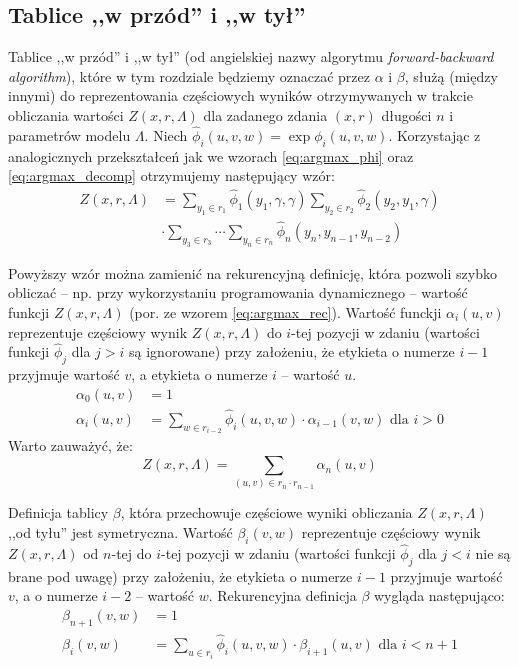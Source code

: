 \documentclass[a4paper,10]{article}
\begin{document}
\subsection{Tablice ,,w przód'' i ,,w tył''}

Tablice ,,w przód'' i ,,w tył'' (od angielskiej nazwy algorytmu
\emph{forward-backward algorithm}), które w tym rozdziale będziemy
oznaczać przez $\alpha$ i $\beta$, służą (między innymi) do
reprezentowania częściowych wyników otrzymywanych w trakcie obliczania
wartości $Z(x, r, \Lambda)$ dla zadanego zdania $(x, r)$ długości $n$
i parametrów modelu $\Lambda$. 
Niech $\hat\phi_i(u, v, w) = \exp\phi_i(u, v, w)$.
Korzystając z analogicznych przekształceń jak we wzorach \ref{eq:argmax_phi}
oraz \ref{eq:argmax_decomp} otrzymujemy następujący wzór: 
\begin{align}
Z(x, r, \Lambda) &=
  \sum_{y_1 \in r_1} \hat\phi_1(y_1, \gamma, \gamma)
  \sum_{y_2 \in r_2} \hat\phi_2(y_2, y_1, \gamma)\\
  &\cdot
  \sum_{y_3 \in r_3} \dotsm
  \sum_{y_n \in r_n} \hat\phi_n(y_n, y_{n-1}, y_{n-2}) \nonumber
\end{align}

Powyższy wzór można zamienić na rekurencyjną definicję, która pozwoli
szybko obliczać -- np. przy wykorzystaniu programowania dynamicznego
-- wartość funkcji $Z(x, r, \Lambda)$ (por. ze wzorem \ref{eq:argmax_rec}).
Wartość funckji $\alpha_i(u, v)$ reprezentuje częściowy wynik $Z(x, r, \Lambda)$
do $i$-tej pozycji w zdaniu (wartości funkcji $\hat\phi_j$ dla
$j > i$ są ignorowane) przy założeniu, że etykieta o numerze $i-1$
przyjmuje wartość $v$, a etykieta o numerze $i$ -- wartość $u$.
\begin{align}
\alpha_0(u, v) &= 1 \\
\alpha_i(u, v) &= \sum_{w \in r_{i-2}}
    \hat\phi_i(u, v, w) \cdot \alpha_{i-1}(v, w) \mbox{ dla } i > 0
\end{align}
Warto zauważyć, że:
\begin{equation}
Z(x, r, \Lambda) = \sum_{(u, v) \in r_n \cdot r_{n-1}} \alpha_n(u, v)
\end{equation}

Definicja tablicy $\beta$, która przechowuje częściowe wyniki
obliczania $Z(x, r, \Lambda)$ ,,od tyłu'' jest symetryczna.
Wartość $\beta_i(v, w)$ reprezentuje częściowy wynik $Z(x, r, \Lambda)$
od $n$-tej do $i$-tej pozycji w zdaniu (wartości funkcji $\hat\phi_j$ dla
$j < i$ nie są brane pod uwagę) przy założeniu, że etykieta o numerze
$i-1$ przyjmuje wartość $v$, a o numerze $i-2$ -- wartość $w$.
Rekurencyjna definicja $\beta$ wygląda następująco:
\begin{align}
\beta_{n+1}(v, w) &= 1 \\
\beta_i(v, w) &= \sum_{u \in r_i}
    \hat\phi_i(u, v, w) \cdot \beta_{i+1}(u, v) \mbox{ dla } i < n + 1
\end{align}
\end{document}
